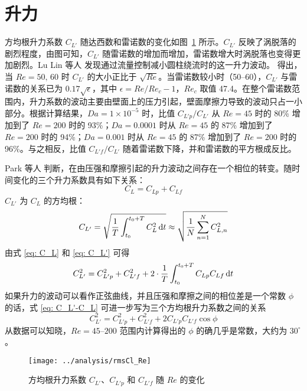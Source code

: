 \section{升力}\label{sec: lift}

方均根升力系数 $C_{L'}$ 随达西数和雷诺数的变化如图~\ref{fig: rmsCl} 所示。$C_{L'}$ 反映了涡脱落的剧烈程度，由图可知，$C_{L'}$ 随雷诺数的增加而增加，雷诺数增大时涡脱落也变得更加剧烈。Lu Lin 等人 \cite{Lu2011} 发现通过流量控制减小圆柱绕流时的这一升力波动。 \cite{Qu2013} 得出，当 $Re=50,\,60$ 时 $C_{L'}$ 的大小正比于 $\sqrt{Re}$。当雷诺数较小时（50--60），$C_{L'}$ 与雷诺数的关系已为 $0.17\sqrt{\epsilon}$，其中 $\epsilon=Re/Re_c-1$，$Re_c$ 取值 47.4\cite{Norberg1994,Kumar2006}。在整个雷诺数范围内，升力系数的波动主要由壁面上的压力引起，壁面摩擦力导致的波动只占一小部分。根据计算结果，$Da=1\times 10^{-5}$ 时，比值 $C_{L'p}/C_{L'}$ 从 $Re=45$ 时的 80\% 增加到了 $Re=200$ 时的 93\%；$Da=0.0001$ 时从 $Re=45$ 的 87\% 增加到了 $Re=200$ 时的 94\%；$Da=0.001$ 时从 $Re=45$ 的 87\% 增加到了 $Re=200$ 时的 96\%。与之相反，比值 $C_{L'f}/C_{L'}$ 随着雷诺数下降，并和雷诺数的平方根成反比。

Park 等人 \cite{Park1998} 判断，在由压强和摩擦引起的升力波动之间存在一个相位的转变。随时间变化的三个升力系数具有如下关系：
\begin{equation}\label{eq: C_L}
	C_L = C_{Lp} + C_{Lf}
\end{equation}
$C_{L'}$ 为 $C_L$ 的方均根：
\begin{equation}\label{eq: C_L'}
	C_{L'} = \sqrt{\frac{1}{T}\int_{t_0}^{t_0+T}C_L^2\,\mathrm{d} t} \approx
	\sqrt{\frac{1}{N}\sum_{n=1}^N C_{L,n}^2}
\end{equation}
由式 \eqref{eq: C_L} 和 \eqref{eq: C_L'} 可得
\begin{equation}\label{eq: C_L'-C_L}
	C_{L'}^2 = C_{L'p}^2 + C_{L'f}^2 + 2\cdot\frac{1}{T}\int_{t_0}^{t_0+T}C_{Lp}C_{Lf}\,\mathrm{d} t
\end{equation}
如果升力的波动可以看作正弦曲线，并且压强和摩擦之间的相位差是一个常数 $\phi$ 的话，式 \eqref{eq: C_L'-C_L} 可进一步写为三个方均根升力系数之间的关系
\begin{equation}
	C_{L'}^2 = C_{L'p}^2 + C_{L'f}^2 + 2C_{L'p}C_{L'f}\cos\phi
\end{equation}
从数据可以知晓，$Re=45$--$200$ 范围内计算得出的 $\phi$ 的确几乎是常数，大约为 $30^\circ$。

\begin{figure}
	\centering
	\texttt{[image: ../analysis/rmsCl\_Re]}
	\caption{方均根升力系数 $C_{L'}$、$C_{L'p}$ 和 $C_{L'f}$ 随 $Re$ 的变化}
	\label{fig: rmsCl}
\end{figure}

